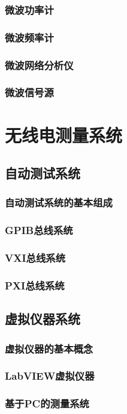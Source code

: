 \documentclass[12pt,UTF8]{ctexbook}
\begin{document}
\section{微波功率计}
\section{微波频率计}
\section{微波网络分析仪}
\section{微波信号源}

\part{无线电测量系统}

\chapter{自动测试系统}
\section{自动测试系统的基本组成}
\section{GPIB总线系统}
\section{VXI总线系统}
\section{PXI总线系统}

\chapter{虚拟仪器系统}
\section{虚拟仪器的基本概念}
\section{LabVIEW虚拟仪器}
\section{基于PC的测量系统}
\end{document}
